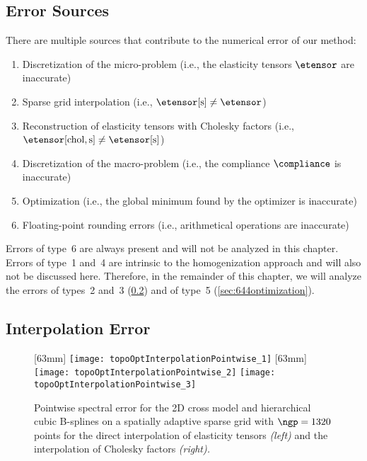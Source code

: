 \subsection{Error Sources}
\label{sec:642errorSources}

There are multiple sources that contribute to the numerical error
of our method:

\begin{enumerate}
  \item
  Discretization of the micro-problem
  (i.e., the elasticity tensors $\etensor$ are inaccurate)
  
  \item
  Sparse grid interpolation
  (i.e., $\etensor[\sparse] \not= \etensor$)
  
  \item
  Reconstruction of elasticity tensors with Cholesky factors
  (i.e., $\etensor[\chol,\sparse] \not= \etensor[\sparse]$)
  
  \item
  Discretization of the macro-problem
  (i.e., the compliance $\compliance$ is inaccurate)
  
  \item
  Optimization
  (i.e., the global minimum found by the optimizer is inaccurate)
  
  \item
  Floating-point rounding errors
  (i.e., arithmetical operations are inaccurate)
\end{enumerate}

\noindent
Errors of type~6 are always present and will not be analyzed in this chapter.
Errors of type~1 and~4 are intrinsic to the homogenization approach
and will also not be discussed here.
Therefore, in the remainder of this chapter,
we will analyze the errors of types~2 and~3 (\cref{sec:643interpolation})
and of type~5 (\cref{sec:644optimization}).



\subsection{Interpolation Error}
\label{sec:643interpolation}

\begin{figure}
  [63mm]{%
    \texttt{[image: topoOptInterpolationPointwise\_1]}%
  }%
  \hspace{3mm}%
  [63mm]{%
    \texttt{[image: topoOptInterpolationPointwise\_2]}%
  }%
  \hfill%
  \texttt{[image: topoOptInterpolationPointwise\_3]}%
  \caption[Pointwise spectral error for the 2D cross model]{%
    Pointwise spectral error for the 2D cross model and
    hierarchical cubic B-splines on a
    spatially adaptive sparse grid with $\ngp = 1320$ points for
    the direct interpolation of elasticity tensors \emph{(left)} and
    the interpolation of Cholesky factors \emph{(right).}%
  }%
  \label{fig:topoOptInterpolationErrorPointwise}%
\end{figure}

